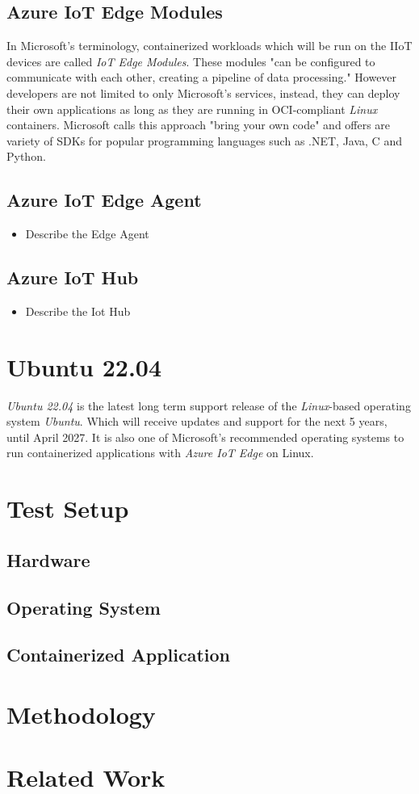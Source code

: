 \subsection{Azure IoT Edge Modules}
In Microsoft's terminology, containerized workloads which will be run on the \ac{IIoT}
devices are called \textit{IoT Edge Modules}. These modules "can be configured to
communicate with each other, creating a pipeline of data processing." However developers are
not limited to only Microsoft's services, instead, they can deploy their own
applications as long as they are running in \ac{OCI}-compliant \textit{Linux} containers.
Microsoft calls this approach "bring your own code" and offers are variety of
\ac{SDK}s for popular programming languages such as .NET, Java, C and Python\cite{msdoc-supportetplatforms}.

\subsection{Azure IoT Edge Agent}
\begin{tcolorbox}[title=TODO]
    \begin{itemize}
        \item Describe the Edge Agent
    \end{itemize}
\end{tcolorbox}

\subsection{Azure IoT Hub}
\begin{tcolorbox}[title=TODO]
    \begin{itemize}
        \item Describe the Iot Hub
    \end{itemize}
\end{tcolorbox}


\section{Ubuntu 22.04}
\textit{Ubuntu 22.04} is the latest long term support release of the \textit{Linux}-based operating system \textit{Ubuntu}. Which will receive updates and support
for the next 5 years, until April 2027\cite{ubuntu-releasenote}. It is also one of
Microsoft's recommended operating systems to run containerized applications with
\textit{Azure IoT Edge} on Linux\cite{msdoc-supportetplatforms}.

\section{Test Setup}
\subsection{Hardware}
\subsection{Operating System}
\subsection{Containerized Application}
\section{Methodology}
\section{Related Work}

